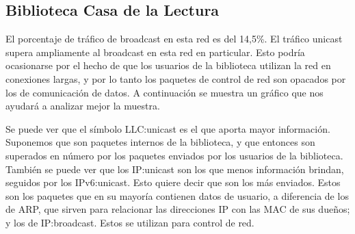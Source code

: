 



\subsection{Biblioteca Casa de la Lectura}

El porcentaje de tráfico de broadcast en esta red es del 14,5\%. El tráfico unicast supera ampliamente
al broadcast en esta red en particular. Esto podría ocasionarse por el hecho de que los
usuarios de la biblioteca utilizan la red en conexiones largas, y por lo tanto los paquetes
de control de red son opacados por los de comunicación de datos. A continuación se muestra un
gráfico que nos ayudará a analizar mejor la muestra.



Se puede ver que el símbolo LLC:unicast es el que aporta mayor información.
Suponemos que son paquetes internos de la biblioteca, y que entonces son
superados en número por los paquetes enviados por los usuarios de la biblioteca.
También se puede ver que los IP:unicast son los que menos información brindan,
seguidos por los IPv6:unicast. Esto quiere decir que son los más enviados.
Estos son los paquetes que en su mayoría contienen datos de usuario,
a diferencia de los de ARP, que sirven para relacionar las direcciones IP con
las MAC de sus dueños; y los de IP:broadcast. Estos se utilizan para control de red.


